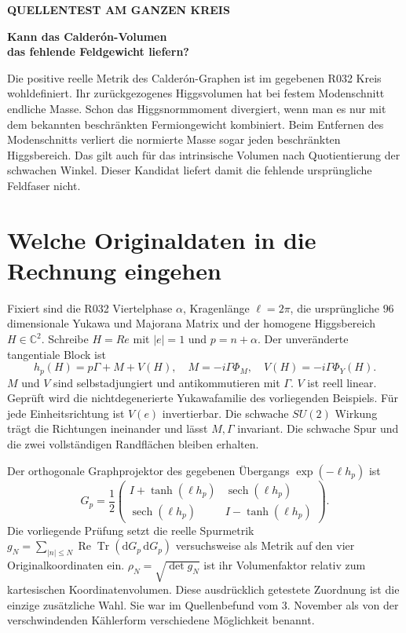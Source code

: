 \documentclass[11pt,a4paper]{article}
\newcommand{\dd}{\mathrm d}
\begin{document}
{\sffamily\bfseries\color{pine} QUELLENTEST AM GANZEN KREIS\par}
\vspace{3mm}
{\sffamily\bfseries\fontsize{24}{28}\selectfont Kann das Calderón-Volumen\\ das fehlende Feldgewicht liefern?\par}
\vspace{4mm}
Die positive reelle Metrik des Calderón-Graphen ist im gegebenen R032 Kreis wohldefiniert. Ihr zurückgezogenes Higgsvolumen hat bei festem Modenschnitt endliche Masse. Schon das Higgsnormmoment divergiert, wenn man es nur mit dem bekannten beschränkten Fermiongewicht kombiniert. Beim Entfernen des Modenschnitts verliert die normierte Masse sogar jeden beschränkten Higgsbereich. Das gilt auch für das intrinsische Volumen nach Quotientierung der schwachen Winkel. Dieser Kandidat liefert damit die fehlende ursprüngliche Feldfaser nicht.

\section*{Welche Originaldaten in die Rechnung eingehen}
Fixiert sind die R032 Viertelphase $\alpha$, Kragenlänge $\ell=2\pi$, die ursprüngliche $96$ dimensionale Yukawa und Majorana Matrix und der homogene Higgsbereich $H\in\mathbb C^2$. Schreibe $H=R e$ mit $|e|=1$ und $p=n+\alpha$. Der unveränderte tangentiale Block ist
\[
 h_p(H)=p\Gamma+M+V(H),\quad M=-i\Gamma\Phi_M,\quad
 V(H)=-i\Gamma\Phi_Y(H).
\]
$M$ und $V$ sind selbstadjungiert und antikommutieren mit $\Gamma$. $V$ ist reell linear. Geprüft wird die nichtdegenerierte Yukawafamilie des vorliegenden Beispiels. Für jede Einheitsrichtung ist $V(e)$ invertierbar. Die schwache $SU(2)$ Wirkung trägt die Richtungen ineinander und lässt $M,\Gamma$ invariant. Die schwache Spur und die zwei vollständigen Randflächen bleiben erhalten.

Der orthogonale Graphprojektor des gegebenen Übergangs $\exp(-\ell h_p)$ ist
\[
 G_p=\frac12\begin{pmatrix}
 I+\tanh(\ell h_p) & \operatorname{sech}(\ell h_p)\\
 \operatorname{sech}(\ell h_p) & I-\tanh(\ell h_p)
 \end{pmatrix}.
\]
Die vorliegende Prüfung setzt die reelle Spurmetrik $g_N=\sum_{|n|\le N}\operatorname{Re}\operatorname{Tr}(\dd G_p\,\dd G_p)$ versuchsweise als Metrik auf den vier Originalkoordinaten ein. $\rho_N=\sqrt{\det g_N}$ ist ihr Volumenfaktor relativ zum kartesischen Koordinatenvolumen. Diese ausdrücklich getestete Zuordnung ist die einzige zusätzliche Wahl. Sie war im Quellenbefund vom 3. November als von der verschwindenden Kählerform verschiedene Möglichkeit benannt.
\end{document}
